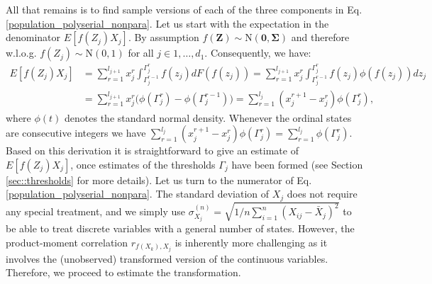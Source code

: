 All that remains is to find sample versions of each of the three components in Eq. \eqref{population_polyserial_nonpara}. Let us start with the expectation in the denominator $E[f(Z_j)X_j]$. By assumption $f(\mathbf{Z}) \sim \text{N}(\mathbf{0},\mathbf{\Sigma})$ and therefore w.l.o.g. $f(Z_j) \sim \text{N}(0,1)$ for all $j \in 1, \dots, d_1$. Consequently, we have:
\begin{equation}
    \begin{split}
        E[f(Z_j)X_j] &= \sum_{r=1}^{l_{j+1}} x^r_j \int_{\Gamma_j^{r-1}}^{\Gamma_j^{r}} f(z_j) d F(f(z_j)) = \sum_{r=1}^{l_{j+1}} x^r_j \int_{\Gamma_j^{r-1}}^{\Gamma_j^{r}} f(z_j) \phi(f(z_j)) dz_j \\
        &= \sum_{r=1}^{l_{j+1}} x^r_j \bigg(\phi(\Gamma_j^r) - \phi(\Gamma_j^{r-1}) \bigg) = \sum_{r=1}^{l_{j}} (x^{r+1}_j - x^r_j)\phi(\Gamma_j^r),
    \end{split}
\end{equation}
where $\phi(t)$ denotes the standard normal density. Whenever the ordinal states are consecutive integers we have $\sum_{r=1}^{l_{j}} (x^{r+1}_j - x^r_j)\phi(\Gamma_j^r) = \sum_{r=1}^{l_{j}}\phi(\Gamma_j^r)$. Based on this derivation it is straightforward to give an estimate of $E[f(Z_j)X_j]$, once estimates of the thresholds $\Gamma_j$ have been formed (see Section \ref{sec::thresholds} for more details). Let us turn to the numerator of Eq. \eqref{population_polyserial_nonpara}. The standard deviation of $X_j$ does not require any special treatment, and we simply use $\sigma^{(n)}_{X_j} = \sqrt{1/n \sum_{i=1}^n (X_{ij} - \bar{X}_{j})^2}$ to be able to treat discrete variables with a general number of states. However, the product-moment correlation $r_{f(X_k), X_j}$ is inherently more challenging as it involves the (unobserved) transformed version of the continuous variables. Therefore, we proceed to estimate the transformation.

